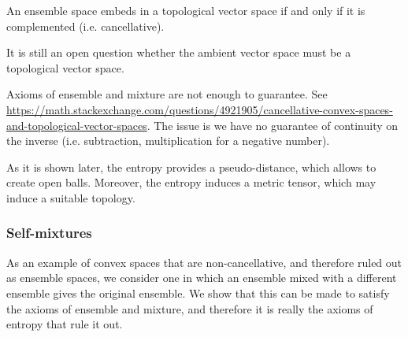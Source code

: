 \begin{conj}\label{pm_es_ensemblesAreTVS}
	An ensemble space embeds in a topological vector space if and only if it is complemented (i.e. cancellative).
\end{conj}

\begin{remark}
	It is still an open question whether the ambient vector space must be a topological vector space. 
	
	Axioms of ensemble and mixture are not enough to guarantee. See \url{https://math.stackexchange.com/questions/4921905/cancellative-convex-spaces-and-topological-vector-spaces}. The issue is we have no guarantee of continuity on the inverse (i.e. subtraction, multiplication for a negative number).
	
	As it is shown later, the entropy provides a pseudo-distance, which allows to create open balls. Moreover, the entropy induces a metric tensor, which may induce a suitable topology.
\end{remark}

\subsubsection{Self-mixtures}


As an example of convex spaces that are non-cancellative, and therefore ruled out as ensemble spaces, we consider one in which an ensemble mixed with a different ensemble gives the original ensemble. We show that this can be made to satisfy the axioms of ensemble and mixture, and therefore it is really the axioms of entropy that rule it out.

